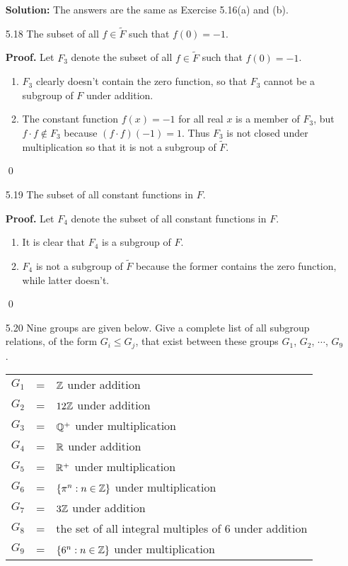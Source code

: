 \begin{enumerate}
      \textbf{Solution:} The answers are the same as Exercise 5.16(a) and (b).
   \item[5.18] The subset of all $f \in \tilde{F}$ such that $f(0) = -1$.

      \textbf{Proof.} Let $F_3$ denote the subset of all $f \in \tilde{F}$ such 
      that $f(0) = -1$.

      \begin{enumerate}
         \item $F_3$ clearly doesn't contain the zero function, so that
               $F_3$ cannot be a subgroup of $F$ under addition.
         \item The constant function $f(x) = -1$ for all real $x$ is a member of
               $F_3$, but $f \cdot f \notin F_3$ because $(f \cdot f)(-1) = 1$.
               Thus $F_3$ is not closed under multiplication so that it is not
               a subgroup of $\tilde{F}$.
      \end{enumerate} \qed
   \item[5.19] The subset of all constant functions in $F$.

      \textbf{Proof.} Let $F_4$ denote the subset of all constant functions in 
      $F$.

      \begin{enumerate}
         \item It is clear that $F_4$ is a subgroup of $F$.
         \item $F_4$ is not a subgroup of $\tilde{F}$ because the former 
               contains the zero function, while latter doesn't.
      \end{enumerate} \qed
   \item[5.20] Nine groups are given below. Give a complete list of all subgroup
               relations, of the form $G_i \le G_j$, that exist between these
               groups $G_1$, $G_2$, $\cdots$, $G_9$.

               \begin{tabular}{@{}l l l@{}}
                  $G_1$ & = & $\mathbb{Z}$ under addition \\
                  $G_2$ & = & $12\mathbb{Z}$ under addition \\
                  $G_3$ & = & $\mathbb{Q}^+$ under multiplication \\
                  $G_4$ & = & $\mathbb{R}$ under addition \\
                  $G_5$ & = & $\mathbb{R}^+$ under multiplication \\
                  $G_6$ & = & $\{\pi^n : n \in \mathbb{Z}\}$ under multiplication \\
                  $G_7$ & = & $3\mathbb{Z}$ under addition \\
                  $G_8$ & = & the set of all integral multiples of 6 under 
                              addition \\
                  $G_9$ & = & $\{6^n : n \in \mathbb{Z}\}$ under multiplication
               \end{tabular}


\end{enumerate}
